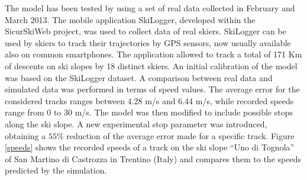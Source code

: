 \documentclass[12pt,a4paper,twoside]{book}
\begin{document}
The model has been tested by using a set of real data collected in February and March 2013. The mobile application SkiLogger, developed within the SicurSkiWeb project, was used to collect data of real skiers. SkiLogger can be used by skiers to track their trajectories by GPS sensors, now usually available also on common smartphones. The application allowed to track a total of 171 Km of descents on ski slopes by 18 distinct skiers. An initial calibration of the model was based on the SkiLogger dataset. A comparison between real data and simulated data was performed in terms of speed values. The average error for the considered tracks ranges between 4.28 m/s and 6.44 m/s, while recorded speeds range from 0 to 30 m/s. The model was then modified to include possible stops along the ski slope. A new experimental stop parameter was introduced, obtaining a $55\%$ reduction of the average error made for a specific track. Figure \ref{speeds} shows the recorded speeds of a track on the ski slope ``Uno di Tognola'' of San Martino di Castrozza in Trentino (Italy) and compares them to the speeds predicted by the simulation.
\end{document}
